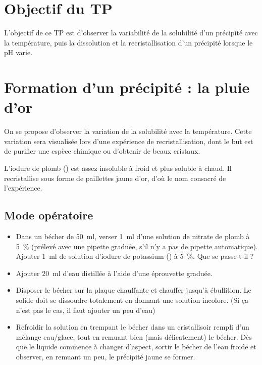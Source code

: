\documentclass{tp}
\begin{document}

\section{Objectif du TP}
L'objectif de ce TP est d'observer la variabilité de la solubilité d'un précipité avec la température, puis la dissolution et la recristallisation d'un précipité lorsque le pH varie.

\section{Formation d'un précipité : la pluie d'or}%
\label{sec:formation_d_un_precipite_la_pluie_d_or}
On se propose d'observer la variation de la solubilité avec la température. Cette variation sera visualisée lors d'une expérience de recristallisation, dont le but est de purifier une espèce chimique ou d'obtenir de beaux cristaux.

L'iodure de plomb () est assez insoluble à froid et plus soluble à chaud. Il recristallise sous forme de paillettes jaune d'or, d'où le nom consacré de l'expérience.

\subsection{Mode opératoire}%
\label{sub:mode_operatoire}

\begin{itemize}
  \item Dans un bécher de \SI{50}{\milli\litre}, verser \SI{1}{\milli\litre} d'une solution de nitrate de plomb à \SI{5}{\percent} (prélevé avec une pipette graduée, s'il n'y a pas de pipette automatique). Ajouter \SI{1}{\milli\litre} de solution d'iodure de potassium () à \SI{5}{\percent}. Que se passe-t-il ?

  \item Ajouter \SI{20}{\milli\litre} d'eau distillée à l'aide d'une éprouvette graduée.

  \item Disposer le bécher sur la plaque chauffante et chauffer jusqu'à ébullition. Le solide doit se dissoudre totalement en donnant une solution incolore. (Si ça n'est pas le cas, il faut ajouter un peu d'eau)

  \item Refroidir la solution en trempant le bécher dans un cristallisoir rempli d'un mélange eau/glace, tout en remuant bien (mais délicatement) le bécher. Dès que le liquide commence à changer d'aspect, sortir le bécher de l'eau froide et observer, en remuant un peu, le précipité jaune se former.
\end{itemize}
\end{document}
